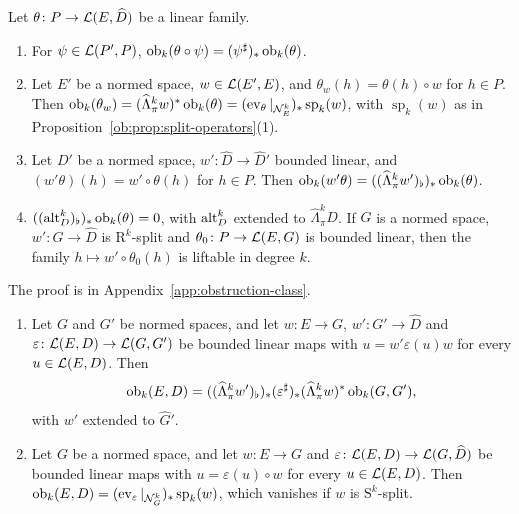 \begin{proposition}[naturality]\label{cmb:prop:naturality}
Let $\theta\colon P\to\mathcal L(E,\widehat D)$ be a linear family.
\begin{enumerate}
\item[(a)] For $\psi\in\mathcal L(P',P)$, $\operatorname{ob}_k(\theta\circ\psi)=(\psi^\sharp)_*\operatorname{ob}_k(\theta)$.
\item[(b)] Let $E'$ be a normed space, $w\in\mathcal L(E',E)$, and $\theta_w(h)=\theta(h)\circ w$ for $h\in P$. Then
$\operatorname{ob}_k(\theta_w)=(\widehat\Lambda^k_\pi w)^*\operatorname{ob}_k(\theta)=(\operatorname{ev}_\theta|_{\mathcal N^k_E})_*\operatorname{sp}_k(w)$, with
$\operatorname{sp}_k(w)$ as in Proposition~\ref{ob:prop:split-operators}(1).
\item[(c)] Let $D'$ be a normed space, $w'\colon\widehat D\to\widehat D'$ bounded linear, and $(w'\theta)(h)=w'\circ\theta(h)$
for $h\in P$. Then $\operatorname{ob}_k(w'\theta)=((\widehat\Lambda^k_\pi w')_\flat)_*\operatorname{ob}_k(\theta)$.
\item[(d)] $((\operatorname{alt}^k_D)_\flat)_*\operatorname{ob}_k(\theta)=0$, with $\operatorname{alt}^k_D$ extended to $\widehat\Lambda^k_\pi D$. If $G$ is a normed
space, $w'\colon G\to\widehat D$ is $\mathrm R^k$-split and $\theta_0\colon P\to\mathcal L(E,G)$ is bounded linear, then the family
$h\mapsto w'\circ\theta_0(h)$ is liftable in degree $k$.
\end{enumerate}
\end{proposition}

The proof is in Appendix~\ref{app:obstruction-class}.

\begin{corollary}[transport]\label{cmb:cor:transport}
\begin{enumerate}
\item Let $G$ and $G'$ be normed spaces, and let $w\colon E\to G$, $w'\colon G'\to\widehat D$ and
$\varepsilon\colon\mathcal L(E,D)\to\mathcal L(G,G')$ be bounded linear maps with $u=w'\varepsilon(u)w$ for every $u\in\mathcal L(E,D)$. Then
\[
 \operatorname{ob}_k(E,D)=((\widehat\Lambda^k_\pi w')_\flat)_*(\varepsilon^\sharp)_*(\widehat\Lambda^k_\pi w)^*\operatorname{ob}_k(G,G'),
\]
with $w'$ extended to $\widehat G'$.
\item Let $G$ be a normed space, and let $w\colon E\to G$ and $\varepsilon\colon\mathcal L(E,D)\to\mathcal L(G,\widehat D)$ be bounded linear
maps with $u=\varepsilon(u)\circ w$ for every $u\in\mathcal L(E,D)$. Then $\operatorname{ob}_k(E,D)=(\operatorname{ev}_\varepsilon|_{\mathcal N^k_G})_*\operatorname{sp}_k(w)$,
which vanishes if $w$ is $\mathrm S^k$-split.
\end{enumerate}
\end{corollary}

